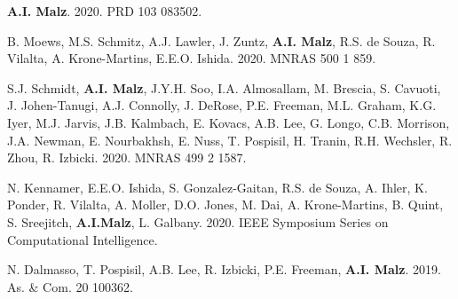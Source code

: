 \begin{list}{\pubnumber{\therefpubnum}}{\malzlist}
\item {\bf A.I. Malz}. 2020. PRD 103 083502. 
	

\item B. Moews, M.S. Schmitz, A.J. Lawler, J. Zuntz, {\bf A.I. Malz}, R.S. de Souza, R. Vilalta, A. Krone-Martins, E.E.O. Ishida. 2020. MNRAS 500 1 859. 
  
\item S.J. Schmidt, {\bf A.I. Malz}, J.Y.H. Soo, %
I.A. Almosallam, M. Brescia, S. Cavuoti, J. Johen-Tanugi, A.J. Connolly, J. DeRose, P.E. Freeman, M.L. Graham, K.G. Iyer, M.J. Jarvis, J.B. Kalmbach, E. Kovacs, A.B. Lee, G. Longo, C.B. Morrison, J.A. Newman, E. Nourbakhsh, E. Nuss, T. Pospisil, H. Tranin, R.H. Wechsler, R. Zhou, R. Izbicki. 
2020. MNRAS 499 2 1587. 

\item N. Kennamer, E.E.O. Ishida, S. Gonzalez-Gaitan, R.S. de Souza, A. Ihler, K. Ponder, R. Vilalta, A. Moller, D.O. Jones, M. Dai, A. Krone-Martins, B. Quint, S. Sreejitch, {\bf A.I.Malz}, L. Galbany. 2020. IEEE Symposium Series on
Computational Intelligence. 

\item N. Dalmasso, T. Pospisil, A.B. Lee, R. Izbicki, P.E. Freeman, {\bf A.I. Malz}. 2019. As. \& Com. 20 100362. 


\end{list}
